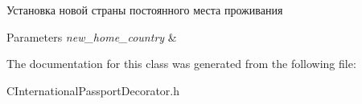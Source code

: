 Установка новой страны постоянного места проживания 


\begin{DoxyParams}{Parameters}
{\em new\+\_\+home\+\_\+country} & \\
\hline
\end{DoxyParams}


The documentation for this class was generated from the following file\+:\begin{DoxyCompactItemize}
\item 
C\+International\+Passport\+Decorator.\+h\end{DoxyCompactItemize}
